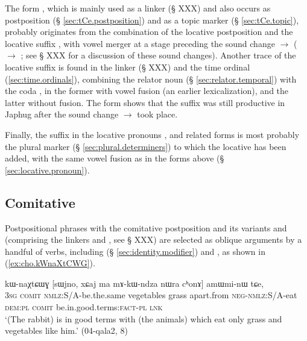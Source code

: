 The form , which is mainly used as a linker (§ XXX) and also occurs as postposition (§ \ref{sec:tCe.postposition}) and as a topic marker (§ \ref{sec:tCe.topic}), probably originates from the combination of the locative postposition  and the locative suffix , with vowel merger at a stage preceding the sound change  $\rightarrow$   ( $\rightarrow$ ; see § XXX for a discussion of these sound changes).
Another trace of the locative suffix  is found in the linker  (§ XXX) and the time ordinal  (\ref{sec:time.ordinals}), combining the relator noun  (§ \ref{sec:relator.temporal}) with the coda , in the former with vowel fusion (an earlier lexicalization), and the latter without fusion. The form    shows that the suffix  was still productive in Japhug after the sound change  $\rightarrow$  took place.

Finally, the suffix  in the locative pronouns ,  and related forms is most probably the plural marker  (§ \ref{sec:plural.determiners}) to which the locative  has been added, with the same vowel fusion as in the forms above (§ \ref{sec:locative.pronoun}).


\subsection{Comitative} \label{sec:comitative} 
Postpositional phrases with the comitative postposition  and its variants  and  (comprising the linkers  and , see § XXX) are selected as oblique arguments by a handful of verbs, including  (§ \ref{sec:identity.modifier}) and , as shown in (\ref{ex:cho.kWnaXtCWG}).

\begin{exe}
\ex \label{ex:cho.kWnaXtCWG}
 kɯ-naχtɕɯɣ [sɯjno, xɕaj ma mɤ-kɯ-ndza nɯra cʰonɤ] amɯmi-nɯ tɕe, \\
\textsc{3sg} \textsc{comit} \textsc{nmlz}:S/A-be.the.same vegetables grass apart.from \textsc{neg}-\textsc{nmlz}:S/A-eat \textsc{dem}:\textsc{pl} \textsc{comit} be.in.good.terms:\textsc{fact}-\textsc{pl} \textsc{lnk} \\
\glt `(The rabbit) is in good terms with (the animals) which eat only grass and vegetables like him.' (04-qala2, 8)
\end{exe}

